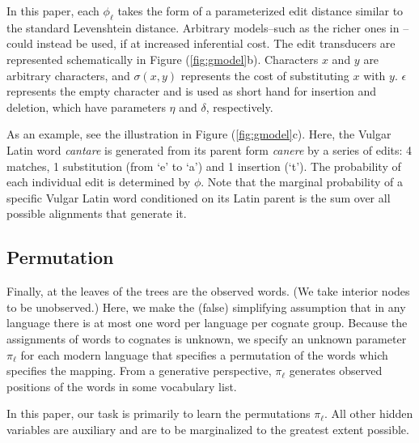 \documentclass[11pt,a4paper]{article}
\begin{document}
In this paper, each $\phi_\ell$ takes the form of a parameterized
edit distance similar to the standard Levenshtein distance.  Arbitrary
models--such as the richer ones in --could
instead be used, if at increased inferential cost.   The edit
transducers are represented schematically in Figure (\ref{fig:gmodel}b).
Characters $x$ and $y$ are arbitrary characters, and $\sigma(x,y)$
represents the cost of substituting $x$ with $y$.  $\epsilon$
represents the empty character and is used as short hand for insertion
and deletion, which have parameters $\eta$ and $\delta$, respectively.

As an example, see the illustration in Figure (\ref{fig:gmodel}c).
Here, the Vulgar Latin word \textit{cantare} is generated from its
parent form \textit{canere} by a series of edits: 4 matches, 1
substitution (from `e' to `a') and 1 insertion (`t').
The probability of each individual edit is determined by $\phi$.
Note that the marginal probability of a specific Vulgar Latin word
conditioned on its Latin parent is the sum over all possible
alignments that generate it.

\subsection{Permutation}

Finally, at the leaves of the trees are the observed words. (We
take interior nodes to be unobserved.) Here, we make the (false)
simplifying assumption that in any language there is at most one
word per language per cognate group. Because the assignments of
words to cognates is unknown, we specify an unknown parameter
$\pi_\ell$ for each modern language that specifies a permutation
of the words which specifies the mapping. From a generative
perspective, $\pi_\ell$ generates observed positions of the words
in some vocabulary list.

In this paper, our task is primarily to learn the permutations
$\pi_\ell$. All other hidden variables are auxiliary and are to be marginalized to the greatest extent possible.
\end{document}
